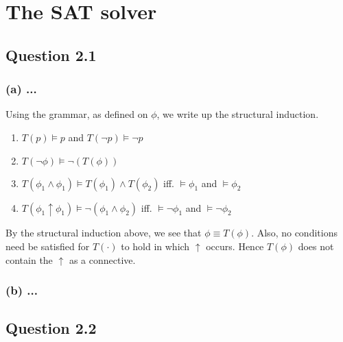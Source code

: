 \section{The SAT solver}
\subsection*{Question 2.1}
\subsubsection*{(a) \mdseries ...}
Using the grammar, as defined on $\phi$, we write up the structural induction.
\begin{enumerate}
	\item $T(p) \models p$ and $T(\neg p) \models \neg p$
	\item $T(\neg \phi) \models \neg (T(\phi))$
	\item $T(\phi_1 \land \phi_1) \models T(\phi_1) \land T(\phi_2)$
	iff. $\models \phi_1$ and $\models \phi_2$
	\item $T(\phi_1 \uparrow \phi_1) \models \neg(\phi_1 \land \phi_2)$
	iff. $\models \neg \phi_1$ and $\models \neg \phi_2$
\end{enumerate}
By the structural induction above, we see that $\phi \equiv T(\phi)$. Also,
no conditions need be satisfied for $T(\cdot)$ to hold in which $\uparrow$
occurs. Hence $T(\phi)$ does not contain the $\uparrow$ as a connective.

\subsubsection*{(b) \mdseries ...}

\subsection*{Question 2.2}
